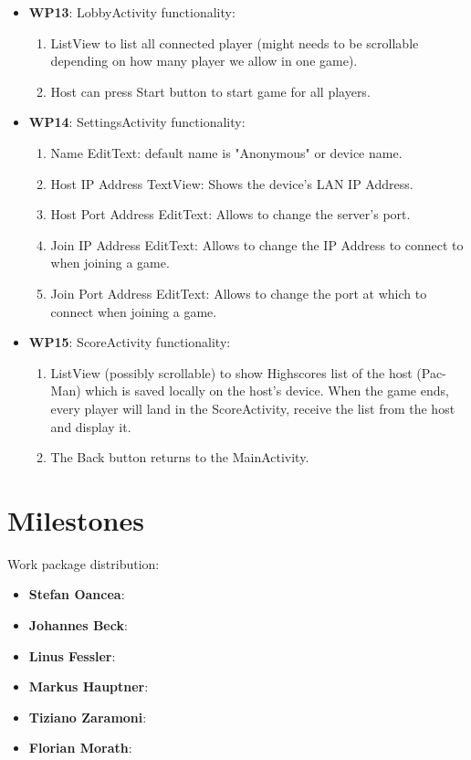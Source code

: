 \documentclass{report}
\begin{document}
\begin{itemize}
\begin{enumerate}
		\end{enumerate}
	\item {\bf WP13}: LobbyActivity functionality:
		\begin{enumerate}
			\item ListView to list all connected player (might needs to be scrollable depending on how many player we allow in one game).
			\item Host can press Start button to start game for all players.
		\end{enumerate}
	\item {\bf WP14}: SettingsActivity functionality:
		\begin{enumerate}
			\item Name EditText: default name is "Anonymous" or device name.
			\item Host IP Address TextView: Shows the device's LAN IP Address.
			\item Host Port Address EditText: Allows to change the server's port.
			\item Join IP Address EditText: Allows to change the IP Address to connect to when joining a game.
			\item Join Port Address EditText: Allows to change the port at which to connect when joining a game.
		\end{enumerate}
	\item {\bf WP15}: ScoreActivity functionality:
		\begin{enumerate}
			\item ListView (possibly scrollable) to show Highscores list of the host (Pac-Man) which is saved locally on the host's device. When the game ends, every player will land in the ScoreActivity, receive the list from the host and display it.
			\item The Back button returns to the MainActivity.
		\end{enumerate}
\end{itemize}

\section{Milestones}


Work package distribution: 
\begin{itemize}
        \item {\bf Stefan Oancea}:
		\item {\bf Johannes Beck}:
		\item {\bf Linus Fessler}:
		\item {\bf Markus Hauptner}:
		\item {\bf Tiziano Zaramoni}:
		\item {\bf Florian Morath}:
\end{itemize}
\end{document}
